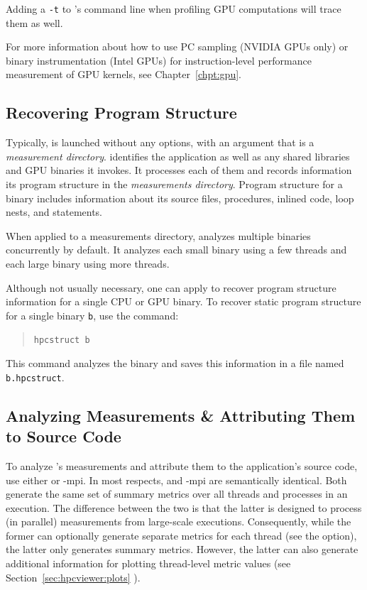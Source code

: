 \documentclass[11pt,twoside,letterpaper]{report}
\begin{document}
Adding a {\tt -t} to \hpcrun{}'s command line when profiling GPU computations will trace them as well.

For more information about how to use PC sampling (NVIDIA GPUs only) or binary instrumentation (Intel GPUs) for instruction-level performance measurement of GPU kernels, see Chapter~\ref{chpt:gpu}.


\subsection{Recovering Program Structure}

Typically, \hpcstruct{} is launched without any options, with an argument that is a \HPCToolkit{}  \emph{measurement directory}.
\hpcstruct{} identifies the application as well as any shared libraries and GPU binaries it invokes.
It processes each of them and records information its program structure in the \emph{measurements directory}.
Program structure for a binary includes information about its source files, procedures, inlined code, loop nests, and statements.

When applied to a measurements directory, \hpcstruct{} analyzes multiple binaries concurrently by default.
It analyzes each small binary using a few threads and each large binary using more threads.

Although not usually necessary, one can apply \hpcstruct{}  to recover program structure information for a single CPU or GPU binary.
To recover static program structure for a single binary \texttt{b}, use the command:
\begin{quote}
  \verb|hpcstruct b|
\end{quote}
This command analyzes the binary and saves this information in a file named \texttt{b.hpcstruct}.



\subsection{Analyzing Measurements \& Attributing Them to Source Code}

To analyze \HPCToolkit{}'s measurements and attribute them to the application's source code, use either \hpcprof{} or \hpcprof-mpi{}.
In most respects, \hpcprof{} and \hpcprof-mpi{} are semantically identical.
Both generate the same set of summary metrics over all threads and processes in an execution.
The difference between the two is that the latter is designed to process (in parallel) measurements from large-scale executions.
Consequently, while the former can optionally generate separate metrics for each thread (see the  option), the latter only generates summary metrics.
However, the latter can also generate additional information for plotting thread-level metric values (see Section~\ref{sec:hpcviewer:plots}%
).
\end{document}
